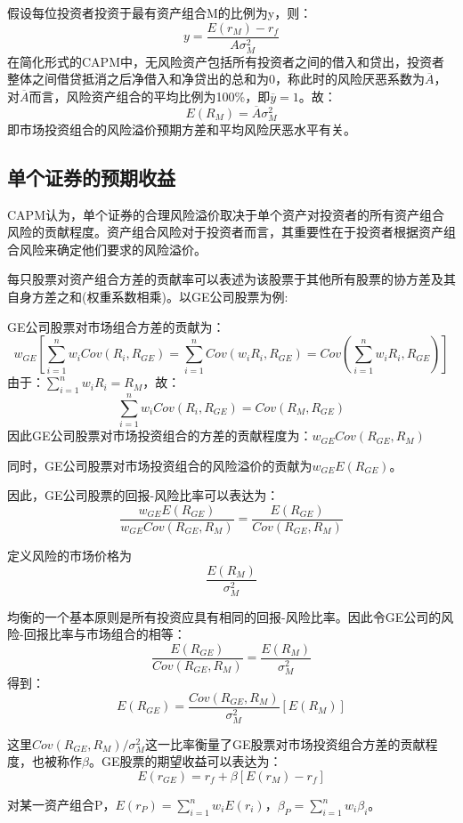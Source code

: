 \documentclass{article}
\begin{document}
假设每位投资者投资于最有资产组合M的比例为y，则：
\[
y=\frac{E(r_M)-r_f}{A\sigma^2_M}
\]
在简化形式的CAPM中，无风险资产包括所有投资者之间的借入和贷出，投资者整体之间借贷抵消之后净借入和净贷出的总和为0，称此时的风险厌恶系数为$ \overline{A} $，对$ \overline{A} $而言，风险资产组合的平均比例为100\%，即$ \overline{y}=1 $。故：
\[
E(R_M)=\overline{A}\sigma^2_M
\]
即市场投资组合的风险溢价预期方差和平均风险厌恶水平有关。
\subsection{单个证券的预期收益}
CAPM认为，单个证券的合理风险溢价取决于单个资产对投资者的所有资产组合风险的贡献程度。资产组合风险对于投资者而言，其重要性在于投资者根据资产组合风险来确定他们要求的风险溢价。

每只股票对资产组合方差的贡献率可以表述为该股票于其他所有股票的协方差及其自身方差之和(权重系数相乘)。以GE公司股票为例:

GE公司股票对市场组合方差的贡献为：
\[
w_{GE}[\sum_{i=1}^{n}w_iCov(R_i,R_{GE})=\sum_{i=1}^{n}Cov(w_iR_i,R_{GE})=Cov(\sum_{i=1}^{n}w_iR_i,R_{GE})]
\]
由于：$ \sum_{i=1}^{n}w_iR_i=R_M $，故：
\[
\sum_{i=1}^{n}w_iCov(R_i,R_{GE})=Cov(R_M,R_{GE})
\]
因此GE公司股票对市场投资组合的方差的贡献程度为：$ w_{GE}Cov(R_{GE},R_M) $

\hspace*{\fill}

同时，GE公司股票对市场投资组合的风险溢价的贡献为$ w_{GE}E(R_{GE}) $。

\hspace*{\fill}

因此，GE公司股票的回报-风险比率可以表达为：
\[
\frac{w_{GE}E(R_{GE})}{w_{GE}Cov(R_{GE},R_M)}=\frac{E(R_{GE})}{Cov(R_{GE},R_M)}
\]

\hspace*{\fill}

定义风险的市场价格为
\[
\frac{E(R_M)}{\sigma^2_M}
\]

\hspace*{\fill}

均衡的一个基本原则是所有投资应具有相同的回报-风险比率。因此令GE公司的风险-回报比率与市场组合的相等：
\[
\frac{E(R_{GE})}{Cov(R_{GE},R_M)}=\frac{E(R_M)}{\sigma^2_M}
\]
得到：
\[
E(R_{GE})=\frac{Cov(R_{GE},R_M)}{\sigma^2_M}[E(R_M)]
\]

这里$ Cov(R_{GE},R_{M})/\sigma^2_M $这一比率衡量了GE股票对市场投资组合方差的贡献程度，也被称作$ \beta $。GE股票的期望收益可以表达为：
\[
E(r_{GE})=r_f+\beta[E(r_M)-r_f]
\]

对某一资产组合P，$ E(r_P)=\sum_{i=1}^{n}w_iE(r_i) $，$ \beta_P=\sum_{i=1}^{n}w_i\beta_i $。
\end{document}
